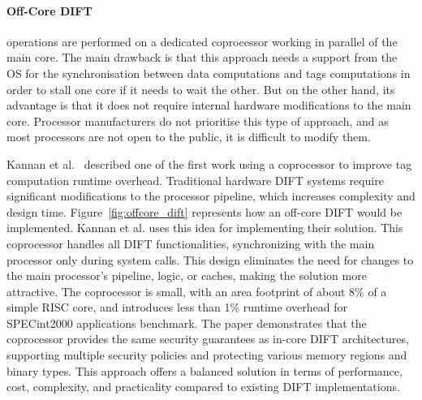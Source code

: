 \paragraph{Off-Core DIFT} operations are performed on a dedicated coprocessor working in parallel of the main core.
The main drawback is that this approach needs a support from the OS for the synchronisation between data computations and tags computations in order to stall one core if it needs to wait the other. But on the other hand, its advantage is that it does not require internal hardware modifications to the main core. Processor manufacturers do not prioritise this type of approach, and as most processors are not open to the public, it is difficult to modify them.

Kannan et al.~\cite{KDK-09-dsn} described one of the first work using a coprocessor to improve tag computation runtime overhead. Traditional hardware DIFT systems require significant modifications to the processor pipeline, which increases complexity and design time. Figure~\ref{fig:offcore_dift} represents how an off-core DIFT would be implemented. Kannan et al. uses this idea for implementing their solution.
This coprocessor handles all DIFT functionalities, synchronizing with the main processor only during system calls. This design eliminates the need for changes to the main processor's pipeline, logic, or caches, making the solution more attractive. The coprocessor is small, with an area footprint of about 8\% of a simple RISC core, and introduces less than 1\% runtime overhead for SPECint2000 applications benchmark. The paper demonstrates that the coprocessor provides the same security guarantees as in-core DIFT architectures, supporting multiple security policies and protecting various memory regions and binary types. This approach offers a balanced solution in terms of performance, cost, complexity, and practicality compared to existing DIFT implementations.

